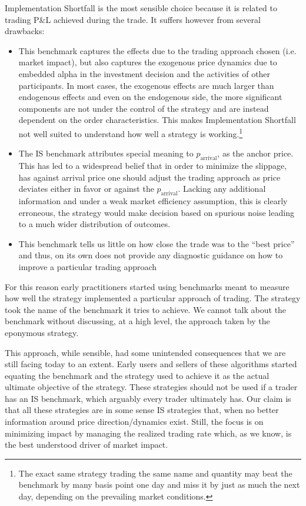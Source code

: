 Implementation Shortfall is the most sensible choice because it is related to trading P\&L achieved during the trade.  It suffers however from several drawbacks:

\begin{itemize}
\item This benchmark captures the effects due to the trading approach chosen (i.e. market impact), but also captures the exogenous price dynamics due to embedded alpha in the investment decision and the activities of other participants. In most cases, the exogenous effects are much larger than endogenous effects and even on the endogenous side, the more significant components are not under the control of the strategy and are instead dependent on the order characteristics. This makes Implementation Shortfall not well suited to understand how well a strategy is working.\footnote{The exact same strategy trading the same name and quantity may beat the benchmark by many basis point one day and miss it by just as much the next day, depending on the prevailing market conditions.}

\item The IS benchmark attributes special meaning to $p_{\text{arrival}}$, as the anchor price. This has led to a widespread belief that in order to minimize the slippage, has against arrival price one should adjust the trading approach as price deviates either in favor or against the   $p_{\text{arrival}}$. Lacking any additional information and under a weak market efficiency assumption, this is clearly erroneous, the strategy would make decision based on spurious noise leading to a much wider distribution of outcomes.

\item This benchmark tells us little on how close the trade was to the ``best price'' and thus, on its own does not provide any diagnostic guidance on how to improve a particular trading approach
\end{itemize}


For this reason early practitioners started using benchmarks meant to measure how well the strategy implemented a particular approach of trading. The strategy took the name of the benchmark it tries to achieve. We cannot talk about the benchmark without discussing, at a high level, the approach taken by the  eponymous strategy.


This approach, while sensible, had some unintended consequences that we are still facing today to an extent. Early users and sellers of these algorithms started equating the benchmark and the strategy used to achieve it as the actual ultimate objective of the strategy. These strategies should not be used if a trader has an IS benchmark, which arguably every trader ultimately has. Our claim is that all these strategies are in some sense IS strategies that, when no better information around price direction/dynamics exist. Still, the focus is on minimizing impact by managing the realized trading rate which, as we know, is the best understood driver of market impact.


